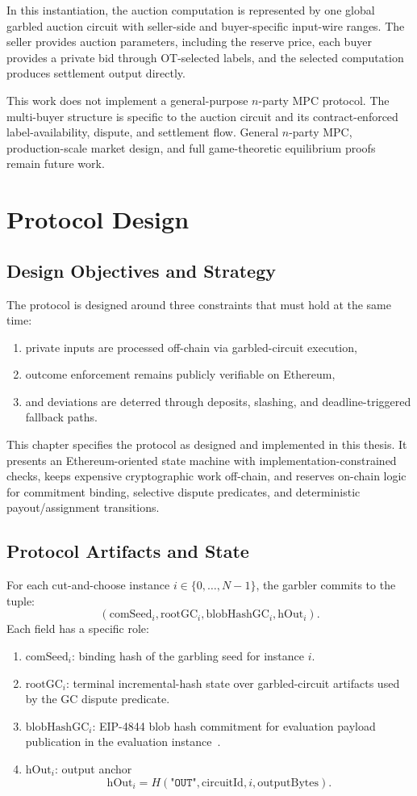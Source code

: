 \documentclass[final,twoside]{vutinfth}
\begin{document}
In this instantiation, the auction computation is represented by one global
garbled auction circuit with seller-side and buyer-specific input-wire ranges.
The seller provides auction parameters, including the reserve price, each buyer provides
a private bid through OT-selected labels, and the selected computation produces
settlement output directly.

This work does not implement a general-purpose $n$-party MPC protocol. The
multi-buyer structure is specific to the auction circuit and its
contract-enforced label-availability, dispute, and settlement flow. General
$n$-party MPC, production-scale market design, and full game-theoretic
equilibrium proofs remain future work.

\chapter{Protocol Design}
\section{Design Objectives and Strategy}
The protocol is designed around three constraints that must hold at the same time:
\begin{enumerate}
\item private inputs are processed off-chain via garbled-circuit execution,
\item outcome enforcement remains publicly verifiable on Ethereum,
\item and deviations are deterred through deposits, slashing, and deadline-triggered fallback paths.
\end{enumerate}

This chapter specifies the protocol as designed and implemented in this thesis.
It presents an Ethereum-oriented state machine with
implementation-constrained checks, keeps expensive cryptographic work
off-chain, and reserves on-chain logic for commitment binding, selective
dispute predicates, and deterministic payout/assignment transitions.

\section{Protocol Artifacts and State}
For each cut-and-choose instance $i\in\{0,\dots,N-1\}$, the garbler commits to
the tuple:
\[
(\mathrm{comSeed}_i,\mathrm{rootGC}_i,\mathrm{blobHashGC}_i,\mathrm{hOut}_i).
\]
Each field has a specific role:
\begin{enumerate}
\item \textbf{$\mathrm{comSeed}_i$}: binding hash of the garbling seed for instance $i$.
\item \textbf{$\mathrm{rootGC}_i$}: terminal incremental-hash state over garbled-circuit artifacts used by the GC dispute predicate.
\item \textbf{$\mathrm{blobHashGC}_i$}: EIP-4844 blob hash commitment for evaluation payload publication in the evaluation instance~\cite{Buterin2022EIP4844}.
\item \textbf{$\mathrm{hOut}_i$}: output anchor
\[
\mathrm{hOut}_i = H(\texttt{"OUT"},\mathrm{circuitId},i,\mathrm{outputBytes}).
\]
\end{enumerate}
\end{document}
